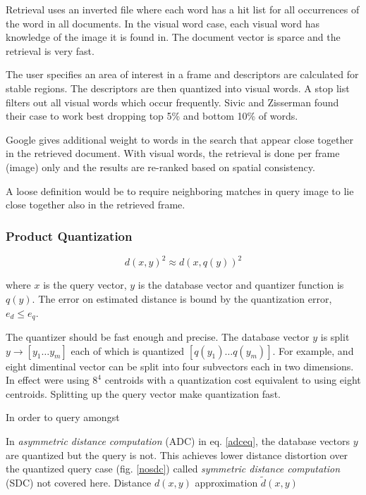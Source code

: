 \documentclass[english,12pt,a4paper,pdftex,elec,utf8]{aaltothesis}
\begin{document}
Retrieval uses an inverted file where each word has a hit list for all occurrences of the word in all documents. In the visual word case, each visual word has knowledge of the image it is found in. The document vector is sparce and the retrieval is very fast.

The user specifies an area of interest in a frame and descriptors are calculated for stable regions. The descriptors are then quantized into visual words. A stop list filters out all visual words which occur frequently. Sivic and Zisserman found their case to work best dropping top 5\% and bottom 10\% of words.

Google gives additional weight to words in the search that appear close together in the retrieved document. With visual words, the retrieval is done per frame (image) only and the results are re-ranked based on spatial consistency.

A loose definition would be to require neighboring matches in query image to lie close together also in the retrieved frame.

\subsubsection{Product Quantization} \label{PQ}

\begin{equation}
  \label{quantizereq}
d(x,y)^2 \approx d(x,q(y))^2
\end{equation}

where $x$ is the query vector, $y$ is the database vector and quantizer function is $q(y)$. The error on estimated distance is bound by the quantization error, $e_d \leq e_q$.  \cite{Jegou2014}

The quantizer should be fast enough and precise. The database vector $y$ is split $y \rightarrow [y_1 \ldots y_m]$ each of which is quantized $[q(y_1)\ldots q(y_m)]$. For example, and eight dimentinal vector can be split into four subvectors each in two dimensions. In effect were using $8^4$ centroids with a quantization cost equivalent to using eight centroids. Splitting up the query vector make quantization fast. \cite{Jegou2014}

In order to query amongst

In \emph{asymmetric distance computation} (ADC) in eq. \ref{adceq}, the database vectors $y$ are quantized but the query is not. This achieves lower distance distortion over the quantized query case (fig. \ref{nosdc}) called \emph{symmetric distance computation} (SDC) not covered here. Distance $d(x,y)$ approximation $\tilde{d}(x,y)$
\end{document}
